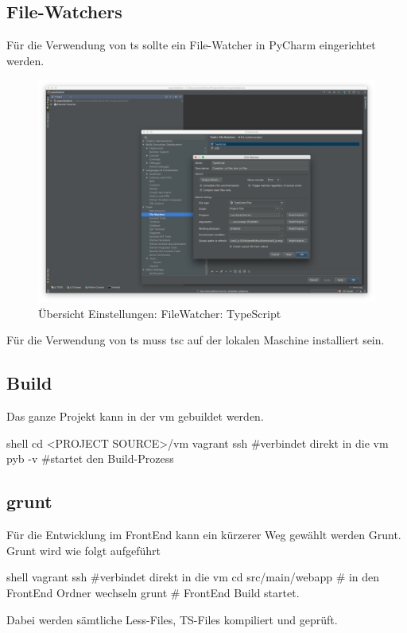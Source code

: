 \subsection{File-Watchers}
Für die Verwendung von \ac{ts} sollte ein File-Watcher in \acs{PyCharm} eingerichtet werden. 
\begin{figure}[H]
	\centering
	\includegraphics[width=\linewidth]{fig/watcher_typescript}
	\caption{Übersicht Einstellungen: FileWatcher: TypeScript}
	\label{fig:sd:watcher-typescript}
\end{figure}
Für die Verwendung von \ac{ts} muss tsc auf der lokalen Maschine installiert sein.

\subsection{Build}
Das ganze Projekt kann in der \ac{vm} gebuildet werden. 
\begin{src}{shell}
cd <PROJECT SOURCE>/vm
vagrant ssh #verbindet direkt in die vm
pyb -v #startet den Build-Prozess
\end{src}
\subsection{grunt}
Für die Entwicklung im FrontEnd kann ein kürzerer Weg gewählt werden \textendash Grunt.
Grunt wird wie folgt aufgeführt
\begin{src}{shell}
vagrant ssh #verbindet direkt in die vm
cd src/main/webapp # in den FrontEnd Ordner wechseln
grunt # FrontEnd Build startet.
\end{src}
Dabei werden sämtliche Less-Files, TS-Files kompiliert und geprüft.
